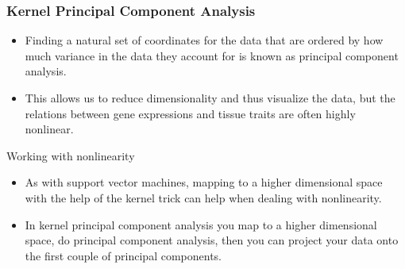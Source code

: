 \documentclass{beamer}
\begin{document}
                         \begin{frame}[t]
                           \frametitle{Kernel Principal Component Analysis}
                           \begin{itemize}
                           \item
                             Finding a natural set of coordinates for the data
                             that are ordered by how much variance in the data
                             they account for is known as principal component
                             analysis. 
                           \item
                             This allows us to reduce dimensionality and thus
                             visualize the data, but the relations between
                             gene expressions and tissue traits are often
                             highly nonlinear.
                           \end{itemize}
                           \begin{block}{Working with nonlinearity}
                             \begin{itemize}
                             \item
                               As with support vector machines, mapping to a
                               higher dimensional space with the help of the
                               kernel trick can help when dealing with 
                               nonlinearity.
                             \item
                               In kernel principal component analysis you map
                               to a higher dimensional space, do principal 
                               component analysis, then you can project your
                               data onto the first couple of principal 
                               components.
                             \end{itemize}                             
                           \end{block}
                         \end{frame}
\end{document}
